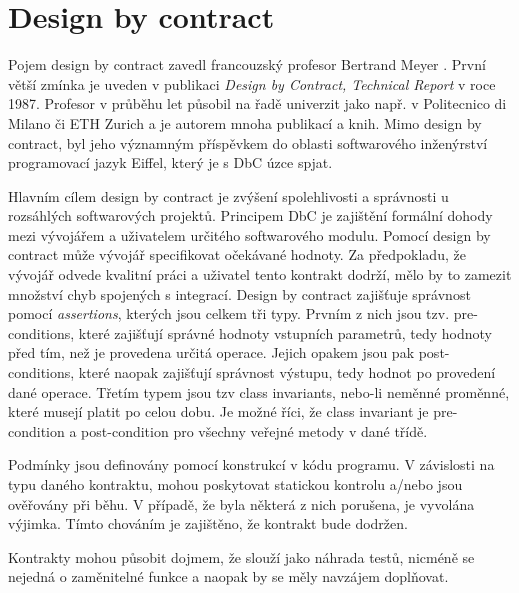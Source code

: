 	\section{Design by contract}
		Pojem design by contract zavedl francouzský profesor Bertrand Meyer \cite{meyerBio}\cite{eiffelStudio}. První větší zmínka je uveden v publikaci \emph{Design by Contract, Technical Report} v roce 1987. Profesor v průběhu let působil na řadě univerzit jako např. v Politecnico di Milano či ETH Zurich a je autorem mnoha publikací a knih. Mimo design by contract, byl jeho významným příspěvkem do oblasti softwarového inženýrství programovací jazyk Eiffel, který je s DbC úzce spjat.	
	
		Hlavním cílem design by contract je zvýšení spolehlivosti a správnosti u rozsáhlých softwarových projektů. Principem DbC je zajištění formální dohody mezi vývojářem a uživatelem určitého softwarového modulu. Pomocí design by contract může vývojář specifikovat očekávané hodnoty. Za předpokladu, že vývojář odvede kvalitní práci a uživatel tento kontrakt dodrží, mělo by to zamezit množství chyb spojených s integrací. Design by contract zajišťuje správnost pomocí \emph{assertions}, kterých jsou celkem tři typy. Prvním z nich jsou tzv. pre-conditions, které zajišťují správné hodnoty vstupních parametrů, tedy hodnoty před tím, než je provedena určitá operace. Jejich opakem jsou pak post-conditions, které naopak zajišťují správnost výstupu, tedy hodnot po provedení dané operace. Třetím typem jsou tzv class invariants, nebo-li neměnné proměnné, které musejí platit po celou dobu. Je možné říci, že class invariant je pre-condition a post-condition pro všechny veřejné metody v dané třídě.
	
	Podmínky jsou definovány pomocí konstrukcí v kódu programu. V závislosti na typu daného kontraktu, mohou poskytovat statickou kontrolu a/nebo jsou ověřovány při běhu. V případě, že byla některá z nich porušena, je vyvolána výjimka. Tímto chováním je zajištěno, že kontrakt bude dodržen.
	
	Kontrakty mohou působit dojmem, že slouží jako náhrada testů, nicméně se nejedná o zaměnitelné funkce a naopak by se měly navzájem doplňovat.
	

